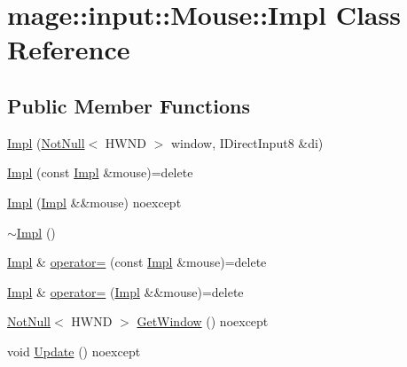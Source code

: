 \hypertarget{classmage_1_1input_1_1_mouse_1_1_impl}{}\section{mage\+:\+:input\+:\+:Mouse\+:\+:Impl Class Reference}
\label{classmage_1_1input_1_1_mouse_1_1_impl}
\subsection*{Public Member Functions}
\begin{DoxyCompactItemize}
\item 
\mbox{\hyperlink{classmage_1_1input_1_1_mouse_1_1_impl_a123b86c874208b15d61eae54a2633a68}{Impl}} (\mbox{\hyperlink{namespacemage_a8769f9d670d6b585ea306cb1062af94b}{Not\+Null}}$<$ H\+W\+ND $>$ window, I\+Direct\+Input8 \&di)
\item 
\mbox{\hyperlink{classmage_1_1input_1_1_mouse_1_1_impl_a8d489809ad53f9e7310983180bc7be98}{Impl}} (const \mbox{\hyperlink{classmage_1_1input_1_1_mouse_1_1_impl}{Impl}} \&mouse)=delete
\item 
\mbox{\hyperlink{classmage_1_1input_1_1_mouse_1_1_impl_a8eed1c46d32964cb28b999b28c39a2b7}{Impl}} (\mbox{\hyperlink{classmage_1_1input_1_1_mouse_1_1_impl}{Impl}} \&\&mouse) noexcept
\item 
\mbox{\hyperlink{classmage_1_1input_1_1_mouse_1_1_impl_a0e1f64d2fadbd25d216e0495d141b867}{$\sim$\+Impl}} ()
\item 
\mbox{\hyperlink{classmage_1_1input_1_1_mouse_1_1_impl}{Impl}} \& \mbox{\hyperlink{classmage_1_1input_1_1_mouse_1_1_impl_a7ca0f042e7d201c312ab26f4bb9e0604}{operator=}} (const \mbox{\hyperlink{classmage_1_1input_1_1_mouse_1_1_impl}{Impl}} \&mouse)=delete
\item 
\mbox{\hyperlink{classmage_1_1input_1_1_mouse_1_1_impl}{Impl}} \& \mbox{\hyperlink{classmage_1_1input_1_1_mouse_1_1_impl_ae994602de981918d84a0b836a403f941}{operator=}} (\mbox{\hyperlink{classmage_1_1input_1_1_mouse_1_1_impl}{Impl}} \&\&mouse)=delete
\item 
\mbox{\hyperlink{namespacemage_a8769f9d670d6b585ea306cb1062af94b}{Not\+Null}}$<$ H\+W\+ND $>$ \mbox{\hyperlink{classmage_1_1input_1_1_mouse_1_1_impl_a53b080d8835ebb887fcadbba57131f00}{Get\+Window}} () noexcept
\item 
void \mbox{\hyperlink{classmage_1_1input_1_1_mouse_1_1_impl_a572b3d4c288bb91d07dc2ae1d57b6e3d}{Update}} () noexcept
\item 

\end{DoxyCompactItemize}
